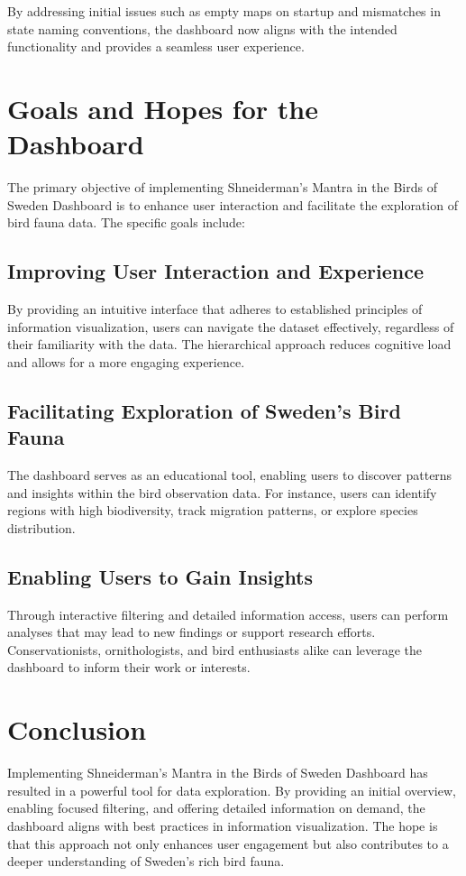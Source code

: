 By addressing initial issues such as empty maps on startup and mismatches in state naming conventions, the dashboard now aligns with the intended functionality and provides a seamless user experience.

\section{Goals and Hopes for the Dashboard}

The primary objective of implementing Shneiderman's Mantra in the Birds of Sweden Dashboard is to enhance user interaction and facilitate the exploration of bird fauna data. The specific goals include:

\subsection{Improving User Interaction and Experience}

By providing an intuitive interface that adheres to established principles of information visualization, users can navigate the dataset effectively, regardless of their familiarity with the data. The hierarchical approach reduces cognitive load and allows for a more engaging experience.

\subsection{Facilitating Exploration of Sweden's Bird Fauna}

The dashboard serves as an educational tool, enabling users to discover patterns and insights within the bird observation data. For instance, users can identify regions with high biodiversity, track migration patterns, or explore species distribution.

\subsection{Enabling Users to Gain Insights}

Through interactive filtering and detailed information access, users can perform analyses that may lead to new findings or support research efforts. Conservationists, ornithologists, and bird enthusiasts alike can leverage the dashboard to inform their work or interests.

\section{Conclusion}

Implementing Shneiderman's Mantra in the Birds of Sweden Dashboard has resulted in a powerful tool for data exploration. By providing an initial overview, enabling focused filtering, and offering detailed information on demand, the dashboard aligns with best practices in information visualization. The hope is that this approach not only enhances user engagement but also contributes to a deeper understanding of Sweden's rich bird fauna.